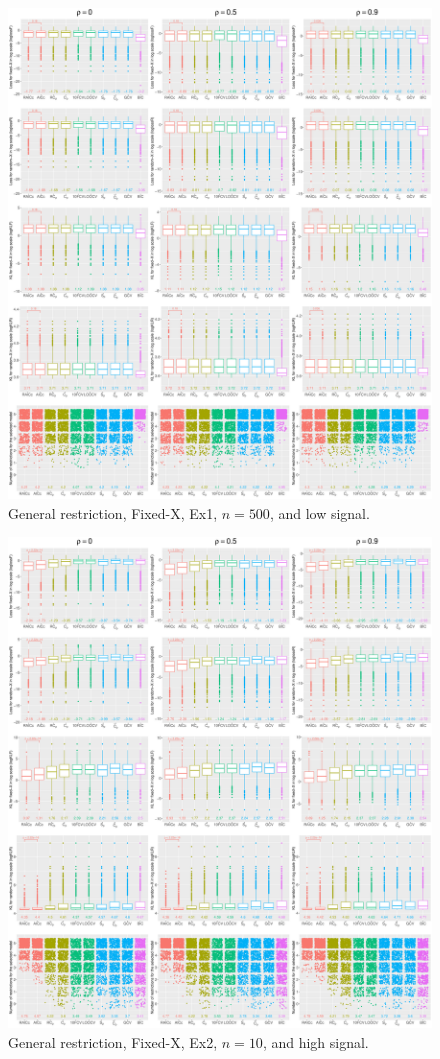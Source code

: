 \begin{figure}[!ht]
\centering
\includegraphics[width=\textwidth]{figures/supplement/fixedx/general_restriction/Ex1_n500_lsnr.eps}
\caption{General restriction, Fixed-X, Ex1, $n=500$, and low signal.}
\end{figure}
\clearpage
\begin{figure}[!ht]
\centering
\includegraphics[width=\textwidth]{figures/supplement/fixedx/general_restriction/Ex2_n10_hsnr.eps}
\caption{General restriction, Fixed-X, Ex2, $n=10$, and high signal.}
\end{figure}
